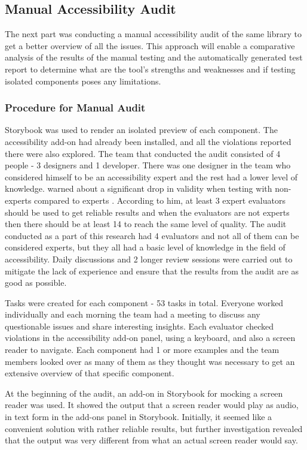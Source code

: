 \documentclass{master_thesis}
\begin{document}
\subsection{Manual Accessibility Audit}

The next part was conducting a manual accessibility audit of the same library to get a better overview of all the issues. This approach will enable a comparative analysis of the results of the manual testing and the automatically generated test report to determine what are the tool's strengths and weaknesses and if testing isolated components poses any limitations.

\subsubsection{Procedure for Manual Audit}
Storybook was used to render an isolated preview of each component. The accessibility add-on had already been installed, and all the violations reported there were also explored. The team that conducted the audit consisted of 4 people - 3 designers and 1 developer.
There was one designer in the team who considered himself to be an accessibility expert and the rest had a lower level of knowledge. \citeauthor{Brajnik2011} warned about a significant drop in validity when testing with non-experts compared to experts \citep{Brajnik2011}. According to him, at least 3 expert evaluators should be used to get reliable results and when the evaluators are not experts then there should be at least 14 to reach the same level of quality. The audit conducted as a part of this research had 4 evaluators and not all of them can be considered experts, but they all had a basic level of knowledge in the field of accessibility. Daily discussions and 2 longer review sessions were carried out to mitigate the lack of experience and ensure that the results from the audit are as good as possible.

Tasks were created for each component - 53 tasks in total. Everyone worked individually and each morning the team had a meeting to discuss any questionable issues and share interesting insights. Each evaluator checked violations in the accessibility add-on panel, using a keyboard, and also a screen reader to navigate. Each component had 1 or more examples and the team members looked over as many of them as they thought was necessary to get an extensive overview of that specific component.

At the beginning of the audit, an add-on in Storybook for mocking a screen reader \citep{Lara} was used. It showed the output that a screen reader would play as audio, in text form in the add-ons panel in Storybook. Initially, it seemed like a convenient solution with rather reliable results, but further investigation revealed that the output was very different from what an actual screen reader would say.
\end{document}
